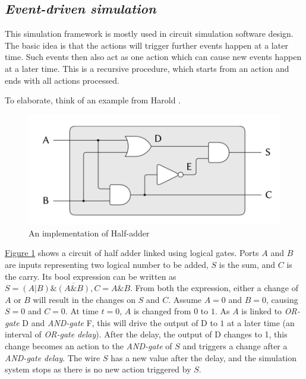 \documentclass[12pt,a4paper]{report}
\begin{document}
        \subsection{\emph{Event-driven simulation}}
        This simulation framework is mostly used in circuit simulation software design. The basic idea is that the actions will trigger further events happen at a later time. Such events then also act as one action which can cause new events happen at a later time.
        This is a recursive procedure, which starts from an action and ends with all actions processed.

        To elaborate, think of an example from Harold \cite{book:sicp}. 

        \begin{figure}[ht]
            \centerline{\includegraphics[scale=2.2]{halfadder}}
            \caption{An implementation of Half-adder}
            \label{figure_half_adder}
        \end{figure}

        \hyperref[figure_half_adder]{Figure \ref*{figure_half_adder}} shows a circuit of half adder linked using logical gates. Ports $A$ and $B$ are inputs representing two logical number to be added, $S$ is the sum, and $C$ is the carry. Its bool expression can be written as $S = (A|B)\&\overline{(A\&B)}, C = A\&B$. From both the expression, either a change of $A$ or $B$ will result in the changes on $S$ and $C$.
        Assume $A = 0$ and $B=0$, causing $S = 0$ and $C = 0$. At time $t=0$, $A$ is changed from $0$ to $1$. As $A$ is linked to \emph{OR-gate} D and \emph{AND-gate} F, this will drive the output of D to $1$ at a later time (an interval of \emph{OR-gate delay}). After the delay, the output of D changes to 1, this change becomes an action to the \emph{AND-gate} of $S$ and triggers a change after a \emph{AND-gate delay}.
        The wire $S$ has a new value after the delay, and the simulation system stops as there is no new action triggered by $S$.
\end{document}
